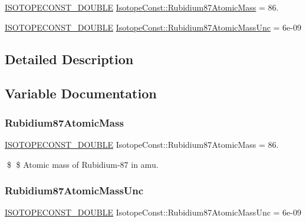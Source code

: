 \begin{DoxyCompactItemize}
\item 
\mbox{\hyperlink{group___isotope_const-_macros_ga8f45a7272ce02c0b4c65c44636ed719a}{I\+S\+O\+T\+O\+P\+E\+C\+O\+N\+S\+T\+\_\+\+D\+O\+U\+B\+LE}} \mbox{\hyperlink{group___isotope_const-_rubidium-_rb87_ga73984316aaad6b65468d3db4b25cd80a}{Isotope\+Const\+::\+Rubidium87\+Atomic\+Mass}} = 86.
\item 
\mbox{\hyperlink{group___isotope_const-_macros_ga8f45a7272ce02c0b4c65c44636ed719a}{I\+S\+O\+T\+O\+P\+E\+C\+O\+N\+S\+T\+\_\+\+D\+O\+U\+B\+LE}} \mbox{\hyperlink{group___isotope_const-_rubidium-_rb87_ga7c27050e1cadd59ab3b2f1ad07739256}{Isotope\+Const\+::\+Rubidium87\+Atomic\+Mass\+Unc}} = 6e-\/09
\end{DoxyCompactItemize}


\subsection{Detailed Description}


\subsection{Variable Documentation}
\mbox{\label{group___isotope_const-_rubidium-_rb87_ga73984316aaad6b65468d3db4b25cd80a}} 
\subsubsection{\texorpdfstring{Rubidium87\+Atomic\+Mass}{Rubidium87AtomicMass}}
{\footnotesize\ttfamily \mbox{\hyperlink{group___isotope_const-_macros_ga8f45a7272ce02c0b4c65c44636ed719a}{I\+S\+O\+T\+O\+P\+E\+C\+O\+N\+S\+T\+\_\+\+D\+O\+U\+B\+LE}} Isotope\+Const\+::\+Rubidium87\+Atomic\+Mass = 86.}

\$ \$ Atomic mass of Rubidium-\/87 in amu. \mbox{\label{group___isotope_const-_rubidium-_rb87_ga7c27050e1cadd59ab3b2f1ad07739256}} 
\subsubsection{\texorpdfstring{Rubidium87\+Atomic\+Mass\+Unc}{Rubidium87AtomicMassUnc}}
{\footnotesize\ttfamily \mbox{\hyperlink{group___isotope_const-_macros_ga8f45a7272ce02c0b4c65c44636ed719a}{I\+S\+O\+T\+O\+P\+E\+C\+O\+N\+S\+T\+\_\+\+D\+O\+U\+B\+LE}} Isotope\+Const\+::\+Rubidium87\+Atomic\+Mass\+Unc = 6e-\/09}

